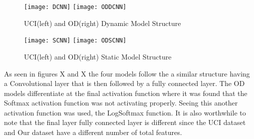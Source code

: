         \begin{figure}[h]
        \centering
        \texttt{[image: DCNN]}\hfill
        \texttt{[image: ODDCNN]}\hfill
        \caption{UCI(left) and OD(right) Dynamic Model Structure}
        \label{fig:figureX}
        \end{figure}

        \begin{figure}[h]
        \centering
        \texttt{[image: SCNN]}\hfill
        \texttt{[image: ODSCNN]}\hfill
        \caption{UCI(left) and OD(right) Static Model Structure}
        \label{fig:figureX}
        \end{figure}

        As seen in figures X and X the four models follow the a similar structure having a Convolutional layer that is then followed by a fully connected layer.
        The OD models differentiate at the final activation function where it was found that the Softmax activation function was not activating properly.
        Seeing this another activation function was used, the LogSoftmax function.
        It is also worthwhile to note that the final layer fully connected layer is different since the UCI dataset and Our dataset have a different number of total features.
